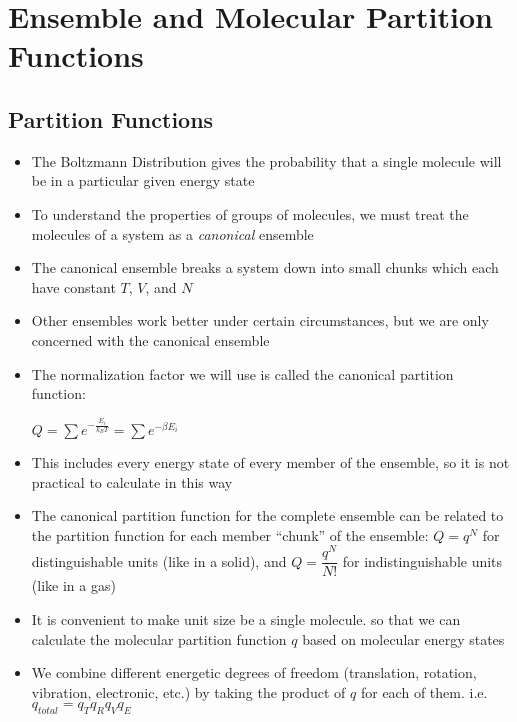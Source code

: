 \documentclass[12pt, openany, letterpaper]{memoir}
\begin{document}
\chapter{Ensemble and Molecular Partition Functions}
\section*{Partition Functions}
\begin{itemize}
	\item The Boltzmann Distribution gives the probability that a single molecule will be in a particular given energy state
	\item To understand the properties of groups of molecules, we must treat the molecules of a system as a \emph{canonical} ensemble
	\item The canonical ensemble breaks a system down into small chunks which each have constant $T$, $V$, and $N$
	\item Other ensembles work better under certain circumstances, but we are only concerned with the canonical ensemble
	\item The normalization factor we will use is called the canonical partition function:
	
	$Q = \sum e^{-\frac{E_i}{k_BT}} = \sum e^{-\beta E_i}$
	\item This includes every energy state of every member of the ensemble, so it is not practical to calculate in this way
	\item The canonical partition function for the complete ensemble can be related to the partition function for each member ``chunk'' of the ensemble: $Q=q^N$ for distinguishable units (like in a solid), and $Q=\dfrac{q^N}{N!}$ for indistinguishable units (like in a gas)
	\item It is convenient to make unit size be a single molecule. so that we can calculate the molecular partition function $q$ based on molecular energy states
	\item We combine different energetic degrees of freedom (translation, rotation, vibration, electronic, etc.) by taking the product of $q$ for each of them. i.e. $q_{total} = q_Tq_Rq_Vq_E$
\end{itemize}
\end{document}
